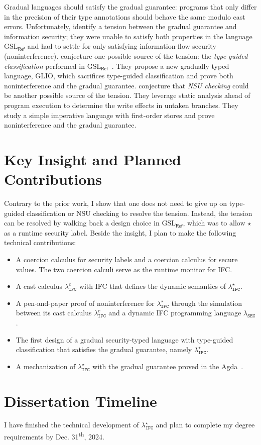 \documentclass[10pt, letterpaper]{article}
\newcommand{\key}[1]{\ensuremath{\mathtt{#1}}}
\newcommand{\Surface}{\ensuremath{\lambda_{\mathtt{IFC}}^\star}\xspace}
\newcommand{\CC}{\ensuremath{\lambda_{\mathtt{IFC}}^{c}}\xspace}
\newcommand{\DynIFC}{\ensuremath{\lambda_{\mathtt{SEC}}}\xspace}
\newcommand{\GSLRef}{\ensuremath{\mathrm{GSL}_\mathsf{Ref}}\xspace}
\newcommand{\unk}{\key{\star}\xspace}
\begin{document}
Gradual languages should satisfy the gradual guarantee: programs that only
differ in the precision of their type annotations should behave the same modulo
cast errors. Unfortunately, \citet{Toro:2018aa} identify a tension between the
gradual guarantee and information security; they were unable to satisfy both
properties in the language \GSLRef and had to settle for only satisfying
information-flow security (noninterference). \citet{Amorim:2020aa} conjecture
one possible source of the tension: the \textit{type-guided classification}
performed in \GSLRef~\citep{Toro:2018aa}. They propose a new gradually typed language,
GLIO, which sacrifices type-guided classification and prove both noninterference and
the gradual guarantee. \citet{bichhawat2021gradual} conjecture that \textit{NSU checking}
could be another possible source of the tension.
They leverage static analysis ahead of program execution to determine
the write effects in untaken branches. They study a
simple imperative language with first-order stores and prove
noninterference and the gradual guarantee.

\section{Key Insight and Planned Contributions}

Contrary to the prior work, I show that one does not need
to give up on type-guided classification or NSU checking to resolve the tension.
Instead, the tension can be resolved by walking back a design choice in \GSLRef,
which was to allow \unk as a runtime security label.
Beside the insight, I plan to make the following technical contributions:

\begin{itemize}
\item A coercion calculus for security labels and a coercion calculus for secure values.
  The two coercion calculi serve as the runtime monitor for IFC.
\item A cast calculus \CC with IFC that defines the dynamic semantics of \Surface.
\item A pen-and-paper proof of noninterference for \Surface through the simulation
  between its cast calculus \CC and a dynamic IFC programming language \DynIFC.
\item The first design of a gradual security-typed language with type-guided classification
  that satisfies the gradual guarantee, namely \Surface.
\item A mechanization of \Surface with the gradual guarantee proved in the Agda~\citep{Bove:2009aa}.
\end{itemize}

\section{Dissertation Timeline}

I have finished the technical development of \Surface and plan to complete my degree requirements
by Dec. 31\textsuperscript{th}, 2024.

\clearpage


\end{document}
